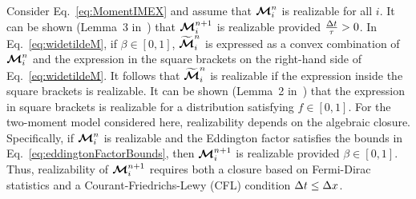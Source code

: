 Consider Eq.~\eqref{eq:MomentIMEX} and assume that $\boldsymbol{\mathcal{M}}_{i}^{n}$ is realizable for all $i$.  
It can be shown (Lemma~3 in~\cite{chu_etal_2018}) that $\boldsymbol{\mathcal{M}}^{n+1}_{i}$ is realizable provided $\frac{\Delta t}{\tau} > 0$. 
In Eq.~\eqref{eq:widetildeM}, if $\beta \in [0,1]$, $\widetilde{\boldsymbol{\mathcal{M}}}^{n}_{i}$ is expressed as a convex combination of $\boldsymbol{\mathcal{M}}_{i}^{n}$ and the expression in the square brackets on the right-hand side of Eq.~\eqref{eq:widetildeM}.  
It follows that $\widetilde{\boldsymbol{\mathcal{M}}}^{n}_{i}$ is realizable if the expression inside the square brackets is realizable.  
It can be shown (Lemma~2 in~\cite{chu_etal_2018}) that the expression in square brackets is realizable for a distribution satisfying $f\in[0,1]$.  
For the two-moment model considered here, realizability depends on the algebraic closure.  
Specifically, if $\boldsymbol{\mathcal{M}}_{i}^{n}$ is realizable and the Eddington factor satisfies the bounds in Eq.~\eqref{eq:eddingtonFactorBounds}, then $\boldsymbol{\mathcal{M}}^{n+1}_{i}$ is realizable provided $\beta \in [0,1]$.  
Thus, realizability of $\boldsymbol{\mathcal{M}}^{n+1}_{i}$ requires both a closure based on Fermi-Dirac statistics and a Courant-Friedrichs-Lewy (CFL) condition $\Delta t\le\Delta x$.  